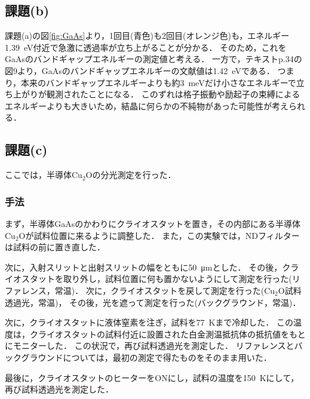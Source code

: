 \documentclass[titlepage]{jsarticle}
\begin{document}
\subsection{課題(b)}

課題(a)の図\ref{fig:GaAs}より，1回目(青色)も2回目(オレンジ色)も，エネルギー\SI{1.39}{\eV}付近で急激に透過率が立ち上がることが分かる．
そのため，これをGaAsのバンドギャップエネルギーの測定値と考える．
一方で，テキストp.34の図9より，GaAsのバンドギャップエネルギーの文献値は\SI{1.42}{\eV}である．
つまり，本来のバンドギャップエネルギーよりも約\SI{3}{\meV}だけ小さなエネルギーで立ち上がりが観測されたことになる．
このずれは格子振動や励起子の束縛によるエネルギーよりも大きいため，結晶に何らかの不純物があった可能性が考えられる．

\subsection{課題(c)}
ここでは，半導体Cu$_2$Oの分光測定を行った．

\subsubsection{手法}
まず，半導体GaAsのかわりにクライオスタットを置き，その内部にある半導体Cu$_2$Oが試料位置に来るように調整した．
また，この実験では，NDフィルターは試料の前に置き直した．

次に，入射スリットと出射スリットの幅をともに\SI{50}{\um}とした．
その後，クライオスタットを取り外し，試料位置に何も置かないようにして測定を行った(リファレンス，常温)．
次に，クライオスタットを戻して測定を行った(Cu$_2$O試料透過光，常温)，
その後，光を遮って測定を行った(バックグラウンド，常温)．

次に，クライオスタットに液体窒素を注ぎ，試料を\SI{77}{\kelvin}まで冷却した．
この温度は，クライオスタットの試料付近に設置された白金測温抵抗体の抵抗値をもとにモニターした．
この状況で，再び試料透過光を測定した．
リファレンスとバックグラウンドについては，最初の測定で得たものをそのまま用いた．

最後に，クライオスタットのヒーターをONにし，試料の温度を\SI{150}{\kelvin}にして，再び試料透過光を測定した．
\end{document}
